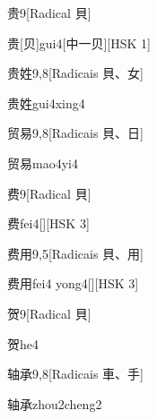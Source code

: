 \begin{entry}{贵}{9}[Radical ⾙]
  \begin{phonetics}{贵}[⻉]{gui4}[中一⻉][HSK 1]
  \end{phonetics}
\end{entry}

\begin{entry}{贵姓}{9,8}[Radicais ⾙、⼥]
  \begin{phonetics}{贵姓}{gui4xing4}
  \end{phonetics}
\end{entry}

\begin{entry}{贸易}{9,8}[Radicais ⾙、⽇]
  \begin{phonetics}{贸易}{mao4yi4}
  \end{phonetics}
\end{entry}

\begin{entry}{费}{9}[Radical ⾙]
  \begin{phonetics}{费}{fei4}[][HSK 3]
  \end{phonetics}
\end{entry}

\begin{entry}{费用}{9,5}[Radicais ⾙、⽤]
  \begin{phonetics}{费用}{fei4 yong4}[][HSK 3]
  \end{phonetics}
\end{entry}

\begin{entry}{贺}{9}[Radical ⾙]
  \begin{phonetics}{贺}{he4}
  \end{phonetics}
\end{entry}

\begin{entry}{轴承}{9,8}[Radicais ⾞、⼿]
  \begin{phonetics}{轴承}{zhou2cheng2}
  \end{phonetics}
\end{entry}

